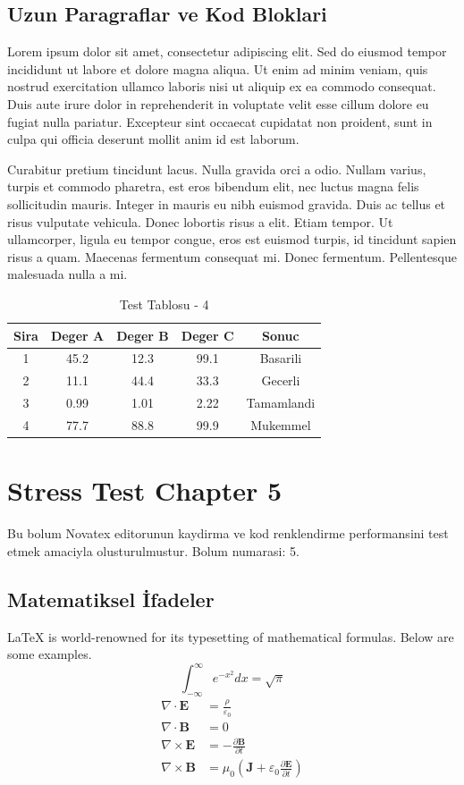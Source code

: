 \documentclass[12pt,a4paper]{article}
\begin{document}
\subsection{Uzun Paragraflar ve Kod Bloklari}
Lorem ipsum dolor sit amet, consectetur adipiscing elit. Sed do eiusmod tempor incididunt ut labore et dolore magna aliqua. Ut enim ad minim veniam, quis nostrud exercitation ullamco laboris nisi ut aliquip ex ea commodo consequat. Duis aute irure dolor in reprehenderit in voluptate velit esse cillum dolore eu fugiat nulla pariatur. Excepteur sint occaecat cupidatat non proident, sunt in culpa qui officia deserunt mollit anim id est laborum.

Curabitur pretium tincidunt lacus. Nulla gravida orci a odio. Nullam varius, turpis et commodo pharetra, est eros bibendum elit, nec luctus magna felis sollicitudin mauris. Integer in mauris eu nibh euismod gravida. Duis ac tellus et risus vulputate vehicula. Donec lobortis risus a elit. Etiam tempor. Ut ullamcorper, ligula eu tempor congue, eros est euismod turpis, id tincidunt sapien risus a quam. Maecenas fermentum consequat mi. Donec fermentum. Pellentesque malesuada nulla a mi.

\begin{table}[h!]
\centering
\begin{tabular}{|c|c|c|c|c|}
\hline
\textbf{Sira} & \textbf{Deger A} & \textbf{Deger B} & \textbf{Deger C} & \textbf{Sonuc} \\
\hline
1 & 45.2 & 12.3 & 99.1 & Basarili \\
2 & 11.1 & 44.4 & 33.3 & Gecerli \\
3 & 0.99 & 1.01 & 2.22 & Tamamlandi \\
4 & 77.7 & 88.8 & 99.9 & Mukemmel \\
\hline
\end{tabular}
\caption{Test Tablosu - 4}
\end{table}

\newpage
\section{Stress Test Chapter 5}
Bu bolum Novatex editorunun kaydirma ve kod renklendirme performansini test etmek amaciyla olusturulmustur. Bolum numarasi: 5.

\subsection{Matematiksel İfadeler}
\LaTeX{} is world-renowned for its typesetting of mathematical formulas. Below are some examples.
\begin{equation}
\int_{-\infty}^{\infty} e^{-x^2} dx = \sqrt{\pi}
\end{equation}
\begin{align}
\nabla \cdot \mathbf{E} &= \frac{\rho}{\varepsilon_0} \\
\nabla \cdot \mathbf{B} &= 0 \\
\nabla \times \mathbf{E} &= -\frac{\partial \mathbf{B}}{\partial t} \\
\nabla \times \mathbf{B} &= \mu_0\left(\mathbf{J} + \varepsilon_0 \frac{\partial \mathbf{E}}{\partial t}\right)
\end{align}
\end{document}
